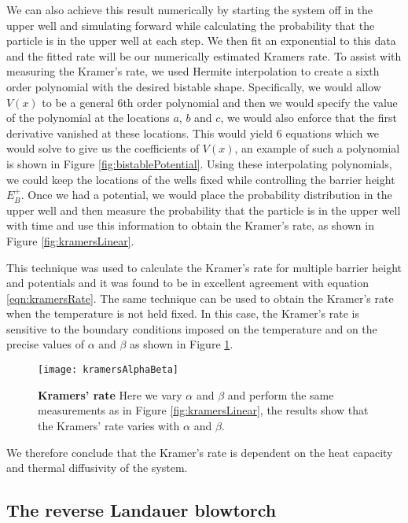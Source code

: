 We can also achieve this result numerically by starting the system off in the upper well and simulating forward while calculating the probability that the particle is in the upper well at each step. We then fit an exponential to this data and the fitted rate will be our numerically estimated Kramers rate. To assist with measuring the Kramer's rate, we used Hermite interpolation to create a sixth order polynomial with the desired bistable shape. Specifically, we would allow $V(x)$ to be a general 6th order polynomial and then we would specify the value of the polynomial at the locations $a$, $b$ and $c$, we would also enforce that the first derivative vanished at these locations. This would yield 6 equations which we would solve to give us the coefficients of $V(x)$, an example of such a polynomial is shown in Figure \ref{fig:bistablePotential}. Using these interpolating polynomials, we could keep the locations of the wells fixed while controlling the barrier height $E_B^+$. Once we had a potential, we would place the probability distribution in the upper well and then measure the probability that the particle is in the upper well with time and use this information to obtain the Kramer's rate, as shown in Figure \ref{fig:kramersLinear}.

This technique was used to calculate the Kramer's rate for multiple barrier height and potentials and it was found to be in excellent agreement with equation \ref{eqn:kramersRate}. The same technique can be used to obtain the Kramer's rate when the temperature is not held fixed. In this case, the Kramer's rate is sensitive to the boundary conditions imposed on the temperature and on the precise values of $\alpha$ and $\beta$ as shown in Figure \ref{fig:kramersAlphaBeta}.

\begin{figure}
	\center
	\texttt{[image: kramersAlphaBeta]}
	\caption{\textbf{Kramers' rate} Here we vary $\alpha$ and $\beta$ and perform the same measurements as in Figure \ref{fig:kramersLinear}, the results show that the Kramers' rate varies with $\alpha$ and $\beta$. \label{fig:kramersAlphaBeta}}
\end{figure}

We therefore conclude that the Kramer's rate is dependent on the heat capacity and thermal diffusivity of the system.

\subsection{The reverse Landauer blowtorch} \label{reverseLandauerBlowtorch}

